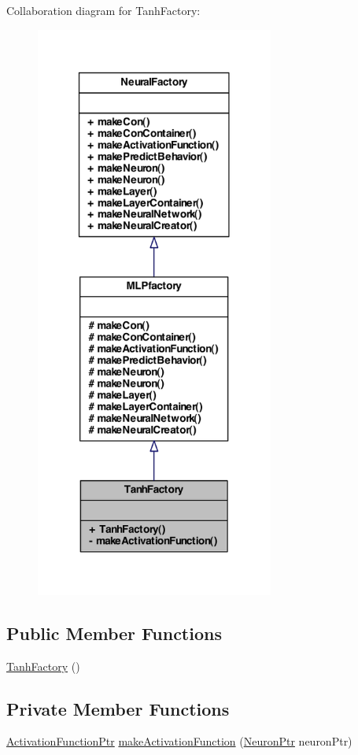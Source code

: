 Collaboration diagram for TanhFactory:
\nopagebreak
\begin{figure}[H]
\begin{center}
\leavevmode
\includegraphics[width=222pt]{class_tanh_factory__coll__graph}
\end{center}
\end{figure}
\subsection*{Public Member Functions}
\begin{DoxyCompactItemize}
\item 
\hyperlink{class_tanh_factory_a71d20d925cd8a40fdc52f45451d11ffa}{TanhFactory} ()
\end{DoxyCompactItemize}
\subsection*{Private Member Functions}
\begin{DoxyCompactItemize}
\item 
\hyperlink{_a_m_o_r_e_8h_a77602a0277a02e5769c3df0adc669b17}{ActivationFunctionPtr} \hyperlink{class_tanh_factory_a476450ea27b571e3548377afd1625372}{makeActivationFunction} (\hyperlink{_a_m_o_r_e_8h_ac1ea936c2c7728eb382278131652fef4}{NeuronPtr} neuronPtr)
\end{DoxyCompactItemize}


